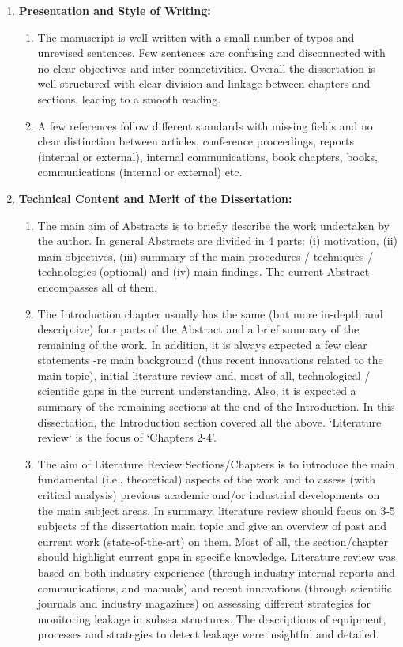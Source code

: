 \documentclass[14pt,twoside]{report}
\begin{document}
\medskip

\begin{enumerate}
%
    \item {\bf Presentation and Style of Writing:}
                \begin{enumerate}
                   \item The manuscript is well written with a small number of typos and unrevised sentences. Few sentences are confusing and disconnected with no clear objectives and inter-connectivities. Overall the dissertation is well-structured with clear division and linkage between chapters and sections, leading to a smooth reading.
                   \item A few references follow different standards with missing fields and no clear distinction between articles, conference proceedings, reports (internal or external), internal communications, book chapters, books, communications (internal or external) etc. 
                \end{enumerate}
%
    \item {\bf Technical Content and Merit of the Dissertation:}
                \begin{enumerate}
                   \item The main aim of Abstracts is to briefly describe the work undertaken by the author. In general Abstracts are divided in 4 parts: (i) motivation, (ii) main objectives, (iii) summary of the main procedures / techniques / technologies (optional) and (iv) main findings. The current Abstract encompasses all of them.
                   \item The Introduction chapter usually has the same (but more in-depth and descriptive) four parts of the Abstract and a brief summary of the remaining of the work. In addition, it is always expected a few clear statements -re main background (thus recent innovations related to the main topic), initial literature review and, most of all, technological / scientific gaps in the current understanding. Also, it is expected a summary of the remaining sections at the end of the Introduction. In this dissertation, the Introduction section covered all the above. `Literature review` is the focus of `Chapters 2-4'. 
                   \item The aim of Literature Review Sections/Chapters is to introduce the main fundamental (i.e., theoretical) aspects of the work and to assess (with critical analysis) previous academic and/or industrial developments on the main subject areas. In summary, literature review should focus on 3-5 subjects of the dissertation main topic and give an overview of past and current work (state-of-the-art) on them. Most of all, the section/chapter should highlight current gaps in specific knowledge. Literature review was based on both industry experience (through industry internal reports and communications, and manuals) and recent innovations (through scientific journals and industry magazines) on assessing different strategies for monitoring leakage in subsea structures. The descriptions of equipment, processes and strategies to detect leakage were insightful and detailed.

\end{enumerate}
\end{enumerate}
\end{document}
